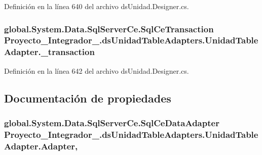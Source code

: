 Definición en la línea 640 del archivo ds\-Unidad.\-Designer.\-cs.

\hypertarget{class_proyecto___integrador__3_1_1ds_unidad_table_adapters_1_1_unidad_table_adapter_a902952d8f7e85197f0a9a3b00b0612ac}{
\subsubsection[{\-\_\-transaction}]{\setlength{\rightskip}{0pt plus 5cm}global.\-System.\-Data.\-Sql\-Server\-Ce.\-Sql\-Ce\-Transaction Proyecto\-\_\-\-Integrador\-\_.\-ds\-Unidad\-Table\-Adapters.\-Unidad\-Table\-Adapter.\-\_\-transaction\hspace{0.3cm}{\ttfamily [private]}}}\label{class_proyecto___integrador__3_1_1ds_unidad_table_adapters_1_1_unidad_table_adapter_a902952d8f7e85197f0a9a3b00b0612ac}


Definición en la línea 642 del archivo ds\-Unidad.\-Designer.\-cs.



\subsection{Documentación de propiedades}
\hypertarget{class_proyecto___integrador__3_1_1ds_unidad_table_adapters_1_1_unidad_table_adapter_a85041318aa5a0582ef54f4af0d332411}{
\subsubsection[{Adapter}]{\setlength{\rightskip}{0pt plus 5cm}global.\-System.\-Data.\-Sql\-Server\-Ce.\-Sql\-Ce\-Data\-Adapter Proyecto\-\_\-\-Integrador\-\_.\-ds\-Unidad\-Table\-Adapters.\-Unidad\-Table\-Adapter.\-Adapter\hspace{0.3cm}{\ttfamily [get]}, {\ttfamily [package]}}}\label{class_proyecto___integrador__3_1_1ds_unidad_table_adapters_1_1_unidad_table_adapter_a85041318aa5a0582ef54f4af0d332411}


